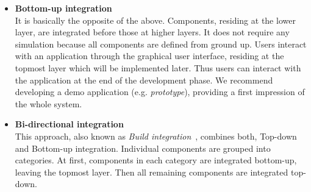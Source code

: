 \documentclass[12pt, notitlepage]{article}
\begin{document}
\begin{itemize}
	\item \textbf{Bottom-up integration}\\
	It is basically the opposite of the above. Components, residing at the lower layer, are integrated before those at higher layers. 
	It does not require any simulation because all components are defined from ground up. Users interact with an application through the graphical user
	interface, residing at the topmost layer which will be implemented later. Thus users can interact with the application at the end of the development phase. 
	We recommend developing a demo application (e.g. \textit{prototype}), providing a first impression of the whole system.
	\item \textbf{Bi-directional integration}~\cite{sw-testing-quality-assurance}\\
	This approach, also known as \textit{Build integration}~\cite{schattenbest}, combines both, Top-down and Bottom-up integration. 
	Individual components are grouped into categories. At first, components in each category are integrated bottom-up, leaving the topmost layer.
	Then all remaining components are integrated top-down.
\end{itemize}
\end{document}
